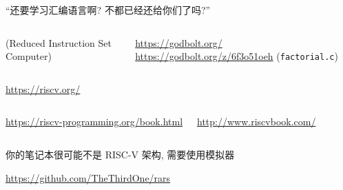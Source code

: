\begin{frame}{}
  \begin{center}
    ``还要学习汇编语言啊? 不都已经还给你们了吗?''
  \end{center}

  \begin{columns}
      {\small (Reduced Instruction Set Computer)}
      \pause
      \begin{center}
         \url{https://godbolt.org/}
        \url{https://godbolt.org/z/6f3o51oeh} (\texttt{factorial.c})
      \end{center}
  \end{columns}
\end{frame}

\begin{frame}{}
  \begin{center}

    \vspace{0.30cm}
    \url{https://riscv.org/}
  \end{center}
\end{frame}

\begin{frame}{}
  \begin{columns}
      \begin{center}

        \vspace{0.30cm}
        \url{https://riscv-programming.org/book.html}
      \end{center}
      \pause
      \begin{center}

        \vspace{0.30cm}
        \url{http://www.riscvbook.com/}
      \end{center}
  \end{columns}
\end{frame}

\begin{frame}{}
  \begin{center}
    你的笔记本很可能不是 RISC-V 架构, 需要使用模拟器

    \vspace{0.30cm}
    \url{https://github.com/TheThirdOne/rars}
  \end{center}
\end{frame}


